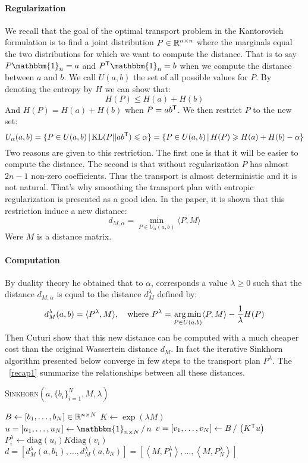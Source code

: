 \paragraph{Regularization}
We recall that the goal of the optimal transport problem in the Kantorovich formulation is to find a joint distribution $P \in \mathbb{R}^{n \times n}$ where the marginals equal the two distributions for which we want to compute the distance. That is to say $P \mathbbm{1}_n = a$ and $P^\trans \mathbbm{1}_n = b$ when we compute the distance between $a$ and $b$. We call $U(a, b)$ the set of all possible values for $P$. By denoting the entropy by $H$ we can show that:
$$ H(P) \leqslant H(a) + H(b) $$
And $H(P) = H(a) + H(b)$ when $P = a b^{\mathsf{T}}$. We then restrict $P$ to the new set:
$$ U_\alpha(a, b) = \{ P \in U(a, b) \, | \, \text{KL}(P || a b^{\mathsf{T}}) \leqslant \alpha \} = \{ P \in U(a, b) \, | \, H(P) \geqslant H(a) + H(b) - \alpha \} $$
Two reasons are given to this restriction. The first one is that it will be easier to compute the distance. The second is that without regularization $P$ has almost $2n-1$ non-zero coefficients. Thus the transport is almost deterministic and it is not natural. That's why smoothing the transport plan with entropic regularization is presented as a good idea. In the paper, it is shown that this restriction induce a new distance:
$$ d_{M, \alpha} = \min_{P \in U_\alpha(a, b)} \langle P, M \rangle $$
Were $M$ is a distance matrix.

\paragraph{Computation}
By duality theory he obtained that to $\alpha$, corresponds a value $\lambda \geqslant 0$ such that the distance $d_{M, \alpha}$ is equal to the distance $d_M^\lambda$ defined by:
$$ d_M^\lambda(a, b) = \langle P^\lambda, M \rangle, \quad \text{where } P^\lambda = \operatorname*{arg\,min}_{P \in U(a, b)} \langle P, M \rangle - \dfrac{1}{\lambda} H(P) $$
Then Cuturi show that this new distance can be computed with a much cheaper cost than the original Wassertein distance $d_M$. In fact the iterative Sinkhorn algorithm presented below converge in few steps to the transport plan $P^\lambda$. The \figurename~\ref{recap1} summarize the relationships between all these distances.

\vspace{3mm}
\begin{algorithm}[H]
	\caption{\textsc{Sinkhorn}$\left( a, \{ b_i \}_{i=1}^N, M, \lambda \right)$}
	$B \gets \left[ b_1, \dots, b_N \right] \in \mathbb{R}^{n \times N}$ \;
	$K \gets \exp \left( \lambda M \right)$ \;
	$u = \left[ u_1, \dots, u_N \right] \gets \mathbbm{1}_{n \times N} \, / \, n$ \;
	$v = \left[ v_1, \dots, v_N \right] \gets B \, / \, \left( K^{\mathsf{T}} u \right)$ \;
	$P^\lambda_i \gets \text{diag}(u_i) K \text{diag}(v_i)$ \;
	\Return $d = \left[ d_M^\lambda(a, b_1), \dots, d_M^\lambda(a, b_N) \right] = \left[ \left\langle M, P^\lambda_1 \right\rangle, \dots, \left\langle M, P^\lambda_N \right\rangle \right]$
\end{algorithm}
\vspace{3mm}

